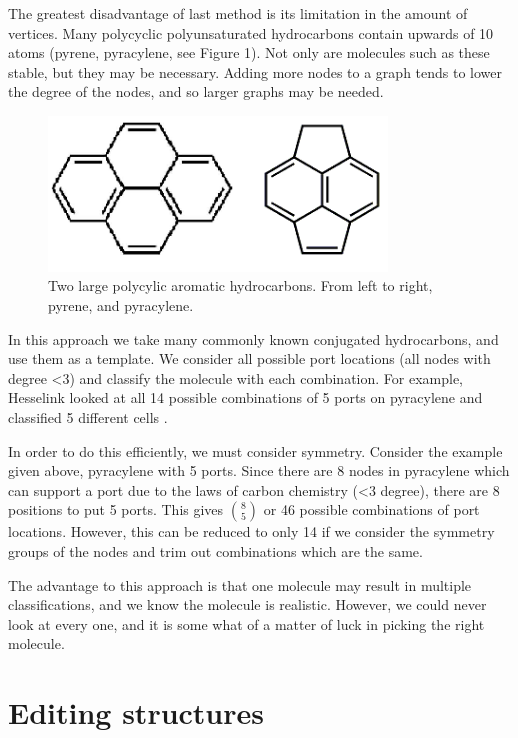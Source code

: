 \documentclass[12pt]{article}
\begin{document}
The greatest disadvantage of last method is its limitation in the amount of vertices. Many polycyclic polyunsaturated hydrocarbons contain upwards of 10 atoms (pyrene, pyracylene, see Figure 1). Not only are molecules such as these stable, but they may be necessary. Adding more nodes to a graph tends to lower the degree of the nodes, and so larger graphs may be needed. 

\begin{figure}[ht!]
\centering
\includegraphics[width=90mm]{bigguys.png}
\caption{Two large polycylic aromatic hydrocarbons. From left to right, pyrene, and pyracylene.}
\end{figure}

In this approach we take many commonly known conjugated hydrocarbons, and use them as a template. We consider all possible port locations (all nodes with degree \textless 3) and classify the molecule with each combination. For example, Hesselink \cite{H13} looked at all 14 possible combinations of 5 ports on pyracylene and classified 5 different cells \cite{H13}. 

In order to do this efficiently, we must consider symmetry. Consider the example given above, pyracylene with 5 ports. Since there are 8 nodes in pyracylene which can support a port due to the laws of carbon chemistry (\textless 3 degree), there are 8 positions to put 5 ports. This gives 	$\binom{8}{5}$ or 46 possible combinations of port locations. However, this can be reduced to only 14 if we consider the symmetry groups of the nodes and trim out combinations which are the same. 

The advantage to this approach is that one molecule may result in multiple classifications, and we know the molecule is realistic. However, we could never look at every one, and it is some what of a matter of luck in picking the right molecule.  

\section{Editing structures}
\end{document}

